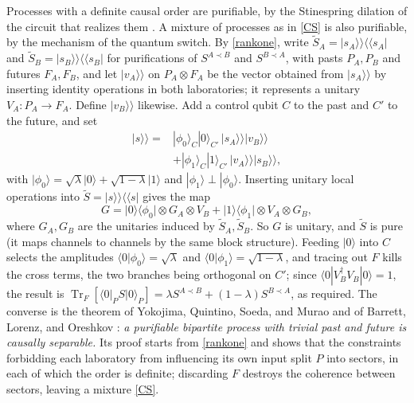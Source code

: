 \documentclass[aps,prl,reprint,superscriptaddress,nofootinbib,longbibliography,raggedbottom]{revtex4-2}
\DeclareMathOperator{\Tr}{Tr}
\newcommand{\ket}[1]{\lvert #1\rangle}
\newcommand{\bra}[1]{\langle #1\rvert}
\begin{document}
Processes with a definite causal order are purifiable, by the Stinespring
dilation of the circuit that realizes them \cite{CDP}. A mixture of processes as in
\eqref{CS} is also purifiable, by the mechanism of the quantum switch.
By \eqref{rankone}, write
$\widetilde S_A=|s_A\rangle\!\rangle\langle\!\langle s_A|$ and
$\widetilde S_B=|s_B\rangle\!\rangle\langle\!\langle s_B|$ for purifications of
$S^{A\prec B}$ and $S^{B\prec A}$, with pasts $P_A,P_B$ and futures
$F_A,F_B$, and let $|v_A\rangle\!\rangle$ on $P_A\otimes F_A$ be the vector
obtained from $|s_A\rangle\!\rangle$ by inserting identity operations in
both laboratories; it represents a unitary $V_A\colon P_A\to F_A$. Define
$|v_B\rangle\!\rangle$ likewise. Add a control qubit $C$ to the past and
$C'$ to the future, and set
\begin{equation}\label{switch}
\begin{split}
|s\rangle\!\rangle={}&
|\phi_0\rangle_C|0\rangle_{C'}\,|s_A\rangle\!\rangle|v_B\rangle\!\rangle\\
&+|\phi_1\rangle_C|1\rangle_{C'}\,|v_A\rangle\!\rangle|s_B\rangle\!\rangle,
\end{split}
\end{equation}
with $|\phi_0\rangle=\sqrt\lambda\ket0+\sqrt{1-\lambda}\ket1$\vadjust{\vskip1.5pt} and
$|\phi_1\rangle\perp|\phi_0\rangle$. Inserting unitary local operations
into $\widetilde S=|s\rangle\!\rangle\langle\!\langle s|$ gives the map
\begin{equation}\label{switchmap}
G=\ket0\bra{\phi_0}\otimes G_A\otimes V_B
 +\ket1\bra{\phi_1}\otimes V_A\otimes G_B ,
\end{equation}
where $G_A,G_B$ are the unitaries induced by $\widetilde S_A,\widetilde S_B$. So $G$ is unitary,
and $\widetilde S$ is pure (it maps channels to channels by the same block structure).
Feeding $\ket0$ into $C$ selects the amplitudes
$\langle0|\phi_0\rangle=\sqrt\lambda$ and
$\langle0|\phi_1\rangle=\sqrt{1-\lambda}$, and tracing out $F$ kills the
cross terms, the two branches being orthogonal on $C'$; since
$\langle0|V_B^\dagger V_B|0\rangle=1$, the result is
$\Tr_F[\bra0_PS\ket0_P]=\lambda S^{A\prec B}+(1-\lambda)S^{B\prec A}$, as
required. The converse is the theorem of Yokojima, Quintino, Soeda, and
Murao \cite{YQSM} and of Barrett, Lorenz, and Oreshkov \cite{BLO}:
\emph{a purifiable bipartite process with trivial past and future is
causally separable.} Its proof starts from \eqref{rankone} and shows that
the constraints forbidding each laboratory from influencing its own input
split $P$ into sectors, in each of which the order is definite;
discarding $F$ destroys the coherence between sectors, leaving a mixture
\eqref{CS}.
\end{document}
